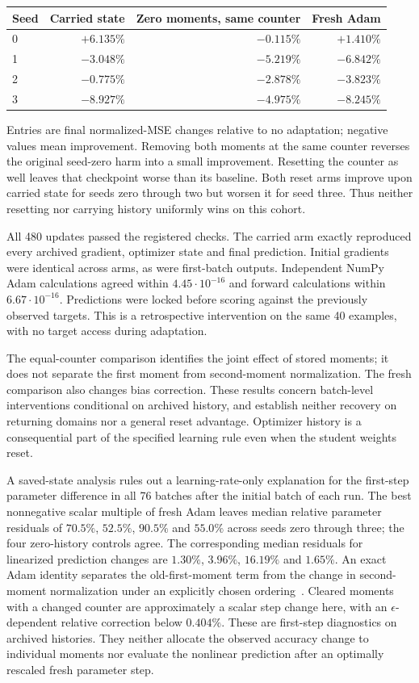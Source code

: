 \documentclass[11pt,a4paper]{article}
\begin{document}
\begin{center}
\begin{tabular}{lrrr}
\hline
Seed & Carried state & Zero moments, same counter & Fresh Adam\\
\hline
0 & $+6.135\%$ & $-0.115\%$ & $+1.410\%$\\
1 & $-3.048\%$ & $-5.219\%$ & $-6.842\%$\\
2 & $-0.775\%$ & $-2.878\%$ & $-3.823\%$\\
3 & $-8.927\%$ & $-4.975\%$ & $-8.245\%$\\
\hline
\end{tabular}
\end{center}
Entries are final normalized-MSE changes relative to no adaptation;
negative values mean improvement. Removing both moments at the same
counter reverses the original seed-zero harm into a small improvement.
Resetting the counter as well leaves that checkpoint worse than its
baseline. Both reset arms improve upon carried state for seeds zero
through two but worsen it for seed three. Thus neither resetting nor
carrying history uniformly wins on this cohort.

All 480 updates passed the registered checks. The carried arm exactly
reproduced every archived gradient, optimizer state and final prediction.
Initial gradients were identical across arms, as were first-batch
outputs. Independent NumPy Adam calculations agreed within
$4.45\cdot10^{-16}$ and forward calculations within
$6.67\cdot10^{-16}$. Predictions were locked before scoring against
the previously observed targets. This is a retrospective intervention
on the same 40 examples, with no target access during adaptation.

The equal-counter comparison identifies the joint effect of stored
moments; it does not separate the first moment from second-moment
normalization. The fresh comparison also changes bias correction.
These results concern batch-level interventions conditional on archived
history, and establish neither recovery on returning domains nor a
general reset advantage. Optimizer history is a consequential part of
the specified learning rule even when the student weights reset.

A saved-state analysis rules out a learning-rate-only explanation for
the first-step parameter difference in all 76 batches after the initial
batch of each run. The best nonnegative scalar multiple of fresh Adam
leaves median relative parameter residuals of $70.5\%$, $52.5\%$,
$90.5\%$ and $55.0\%$ across seeds zero through three; the four
zero-history controls agree. The corresponding median residuals for
linearized prediction changes are $1.30\%$, $3.96\%$, $16.19\%$ and
$1.65\%$. An exact Adam identity separates the old-first-moment term
from the change in second-moment normalization under an explicitly
chosen ordering~\cite{adam}. Cleared moments with a changed counter
are approximately a scalar step change here, with an
$\epsilon$-dependent relative correction below $0.404\%$.
These are first-step diagnostics on archived histories. They neither
allocate the observed accuracy change to individual moments nor evaluate
the nonlinear prediction after an optimally rescaled fresh parameter step.
\end{document}
